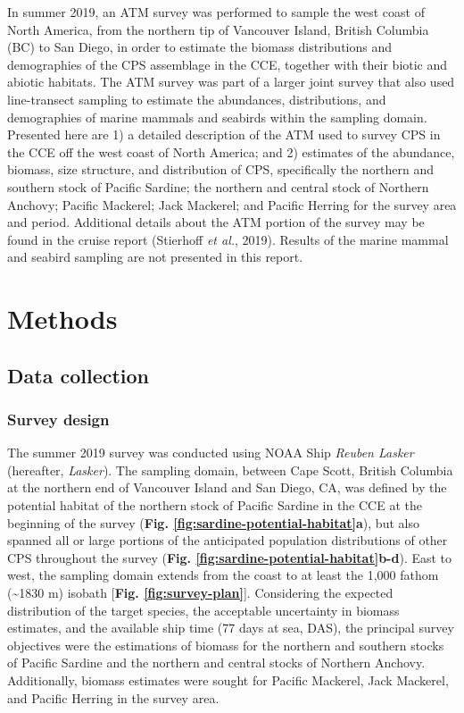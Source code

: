 \documentclass[]{article}
\begin{document}
In summer 2019, an ATM survey was performed to sample the west coast of North America, from the northern tip of Vancouver Island, British Columbia (BC) to San Diego, in order to estimate the biomass distributions and demographies of the CPS assemblage in the CCE, together with their biotic and abiotic habitats. The ATM survey was part of a larger joint survey that also used line-transect sampling to estimate the abundances, distributions, and demographies of marine mammals and seabirds within the sampling domain. Presented here are 1) a detailed description of the ATM used to survey CPS in the CCE off the west coast of North America; and 2) estimates of the abundance, biomass, size structure, and distribution of CPS, specifically the northern and southern stock of Pacific Sardine; the northern and central stock of Northern Anchovy; Pacific Mackerel; Jack Mackerel; and Pacific Herring for the survey area and period. Additional details about the ATM portion of the survey may be found in the cruise report (Stierhoff \emph{et al.}, 2019). Results of the marine mammal and seabird sampling are not presented in this report.

\newpage

\hypertarget{methods}{%
\section{Methods}\label{methods}}

\hypertarget{methods-data-collection}{%
\subsection{Data collection}\label{methods-data-collection}}

\hypertarget{methods-survey-design}{%
\subsubsection{Survey design}\label{methods-survey-design}}

The summer 2019 survey was conducted using NOAA Ship \emph{Reuben Lasker} (hereafter, \emph{Lasker}). The sampling domain, between Cape Scott, British Columbia at the northern end of Vancouver Island and San Diego, CA, was defined by the potential habitat of the northern stock of Pacific Sardine in the CCE at the beginning of the survey (\textbf{Fig. \ref{fig:sardine-potential-habitat}a}), but also spanned all or large portions of the anticipated population distributions of other CPS throughout the survey (\textbf{Fig. \ref{fig:sardine-potential-habitat}b-d}). East to west, the sampling domain extends from the coast to at least the 1,000 fathom (\textasciitilde1830 m) isobath {[}\textbf{Fig. \ref{fig:survey-plan}}{]}. Considering the expected distribution of the target species, the acceptable uncertainty in biomass estimates, and the available ship time (77 days at sea, DAS), the principal survey objectives were the estimations of biomass for the northern and southern stocks of Pacific Sardine and the northern and central stocks of Northern Anchovy. Additionally, biomass estimates were sought for Pacific Mackerel, Jack Mackerel, and Pacific Herring in the survey area.
\end{document}
